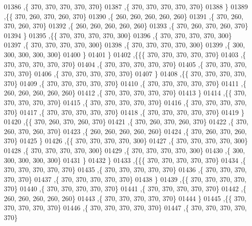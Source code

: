 \begin{DoxyCode}
01386    ,\{   370,   370,   370,   370,   370\}
01387    ,\{   370,   370,   370,   370,   370\}
01388    \}
01389   ,\{\{   370,   260,   370,   260,   370\}
01390    ,\{   260,   260,   260,   260,   260\}
01391    ,\{   370,   260,   370,   260,   370\}
01392    ,\{   260,   260,   260,   260,   260\}
01393    ,\{   370,   260,   370,   260,   370\}
01394    \}
01395   ,\{\{   370,   370,   370,   370,   300\}
01396    ,\{   370,   370,   370,   370,   300\}
01397    ,\{   370,   370,   370,   370,   300\}
01398    ,\{   370,   370,   370,   370,   300\}
01399    ,\{   300,   300,   300,   300,   300\}
01400    \}
01401   \}
01402  ,\{\{\{   370,   370,   370,   370,   370\}
01403    ,\{   370,   370,   370,   370,   370\}
01404    ,\{   370,   370,   370,   370,   370\}
01405    ,\{   370,   370,   370,   370,   370\}
01406    ,\{   370,   370,   370,   370,   370\}
01407    \}
01408   ,\{\{   370,   370,   370,   370,   370\}
01409    ,\{   370,   370,   370,   370,   370\}
01410    ,\{   370,   370,   370,   370,   370\}
01411    ,\{   260,   260,   260,   260,   260\}
01412    ,\{   370,   370,   370,   370,   370\}
01413    \}
01414   ,\{\{   370,   370,   370,   370,   370\}
01415    ,\{   370,   370,   370,   370,   370\}
01416    ,\{   370,   370,   370,   370,   370\}
01417    ,\{   370,   370,   370,   370,   370\}
01418    ,\{   370,   370,   370,   370,   370\}
01419    \}
01420   ,\{\{   370,   260,   370,   260,   370\}
01421    ,\{   370,   260,   370,   260,   370\}
01422    ,\{   370,   260,   370,   260,   370\}
01423    ,\{   260,   260,   260,   260,   260\}
01424    ,\{   370,   260,   370,   260,   370\}
01425    \}
01426   ,\{\{   370,   370,   370,   370,   300\}
01427    ,\{   370,   370,   370,   370,   300\}
01428    ,\{   370,   370,   370,   370,   300\}
01429    ,\{   370,   370,   370,   370,   300\}
01430    ,\{   300,   300,   300,   300,   300\}
01431    \}
01432   \}
01433  ,\{\{\{   370,   370,   370,   370,   370\}
01434    ,\{   370,   370,   370,   370,   370\}
01435    ,\{   370,   370,   370,   370,   370\}
01436    ,\{   370,   370,   370,   370,   370\}
01437    ,\{   370,   370,   370,   370,   370\}
01438    \}
01439   ,\{\{   370,   370,   370,   370,   370\}
01440    ,\{   370,   370,   370,   370,   370\}
01441    ,\{   370,   370,   370,   370,   370\}
01442    ,\{   260,   260,   260,   260,   260\}
01443    ,\{   370,   370,   370,   370,   370\}
01444    \}
01445   ,\{\{   370,   370,   370,   370,   370\}
01446    ,\{   370,   370,   370,   370,   370\}
01447    ,\{   370,   370,   370,   370,   370\}

\end{DoxyCode}
